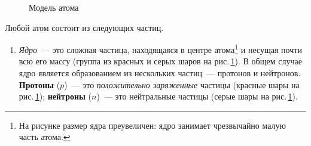 \documentclass[main.tex]{subfiles}
\begin{document}
\begin{NoHyper}
\begin{figure}[H]
\caption{Модель атома}
\label{fig:p88}
\end{figure}


Любой атом состоит из следующих частиц.
\begin{enumerate}
    \item \emph{Ядро}~--- это сложная частица, находящаяся в центре атома\footnote{На рисунке размер ядра преувеличен: ядро занимает чрезвычайно малую часть атома.} и несущая почти всю его массу (группа из красных и серых шаров на рис.\,\ref{fig:p88}). В общем случае ядро является образованием из нескольких частиц~--- протонов и нейтронов. \textbf{Протоны} ($p$)~--- это \emph{положительно заряженные} частицы (красные шары на рис.\,\ref{fig:p88}); \textbf{нейтроны} ($n$)~--- это нейтральные частицы (серые шары на рис.\,\ref{fig:p88}). 


\end{enumerate}
\end{NoHyper}
\end{document}
